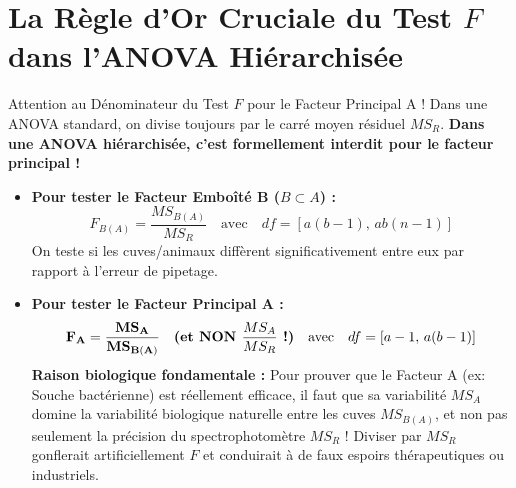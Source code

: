 \documentclass[11pt,a4paper]{article}
\begin{document}
\section{La Règle d'Or Cruciale du Test $F$ dans l'ANOVA Hiérarchisée}

\begin{warnbox}{Attention au Dénominateur du Test $F$ pour le Facteur Principal A !}
Dans une ANOVA standard, on divise toujours par le carré moyen résiduel $MS_R$. \textbf{Dans une ANOVA hiérarchisée, c'est formellement interdit pour le facteur principal !}
\begin{itemize}[leftmargin=*, label=\faExclamationTriangle]
  \item \textbf{Pour tester le Facteur Emboîté B ($B \subset A$) :}
  \begin{equation*}
    F_{B(A)} = \frac{MS_{B(A)}}{MS_R} \quad \text{avec} \quad df = [a(b-1), \, ab(n-1)]
  \end{equation*}
  On teste si les cuves/animaux diffèrent significativement entre eux par rapport à l'erreur de pipetage.
  \item \textbf{Pour tester le Facteur Principal A :}
  \begin{equation*}
    \mathbf{F_A = \frac{MS_A}{MS_{B(A)}}} \quad \text{\textbf{(et NON }} \frac{MS_A}{MS_R} \text{\textbf{ !)}} \quad \text{avec} \quad df = [a-1, \, a(b-1)]
  \end{equation*}
  \textbf{Raison biologique fondamentale :} Pour prouver que le Facteur A (ex: Souche bactérienne) est réellement efficace, il faut que sa variabilité $MS_A$ domine la variabilité biologique naturelle entre les cuves $MS_{B(A)}$, et non pas seulement la précision du spectrophotomètre $MS_R$ ! Diviser par $MS_R$ gonflerait artificiellement $F$ et conduirait à de faux espoirs thérapeutiques ou industriels.
\end{itemize}
\end{warnbox}
\end{document}
